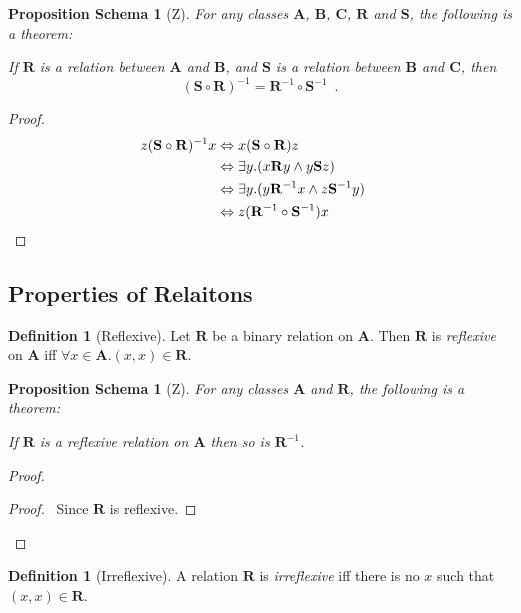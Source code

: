 \documentclass{book}
\let\qed\relax
\newtheorem{props}[ax]{Proposition Schema}
\theoremstyle{definition}
\newtheorem{df}[ax]{Definition}
\begin{document}
\begin{props}[Z]
For any classes $\mathbf{A}$, $\mathbf{B}$, $\mathbf{C}$, $\mathbf{R}$ and $\mathbf{S}$, the following is a theorem:

If $\mathbf{R}$ is a relation between $\mathbf{A}$ and $\mathbf{B}$, and $\mathbf{S}$ is a relation between $\mathbf{B}$ and $\mathbf{C}$, then
\[ (\mathbf{S} \circ \mathbf{R})^{-1} = \mathbf{R}^{-1} \circ \mathbf{S}^{-1} \enspace . \]
\end{props}

\begin{proof}
\pf
\begin{align*}
z(\mathbf{S} \circ \mathbf{R})^{-1}x & \Leftrightarrow x(\mathbf{S} \circ \mathbf{R})z \\
& \Leftrightarrow \exists y. (x \mathbf{R} y \wedge y \mathbf{S}z) \\
& \Leftrightarrow \exists y. (y \mathbf{R}^{-1} x \wedge z \mathbf{S}^{-1} y) \\
& \Leftrightarrow z (\mathbf{R}^{-1} \circ \mathbf{S}^{-1}) x & \qed
\end{align*}
\end{proof}

\subsection{Properties of Relaitons}

\begin{df}[Reflexive]
Let $\mathbf{R}$ be a binary relation on $\mathbf{A}$. Then $\mathbf{R}$ is \emph{reflexive} on $\mathbf{A}$ iff $\forall x \in \mathbf{A}. (x,x) \in \mathbf{R}$.
\end{df}

\begin{props}[Z]
\label{prop:invref}
For any classes $\mathbf{A}$ and $\mathbf{R}$, the following is a theorem:

If $\mathbf{R}$ is a reflexive relation on $\mathbf{A}$ then so is $\mathbf{R}^{-1}$.
\end{props}

\begin{proof}
\pf
{}
\begin{proof}
	\pf\ Since $\mathbf{R}$ is reflexive.
\end{proof}
\qed
\end{proof}

\begin{df}[Irreflexive]
A relation $\mathbf{R}$ is \emph{irreflexive} iff there is no $x$ such that $(x,x) \in \mathbf{R}$.
\end{df}
\end{document}
